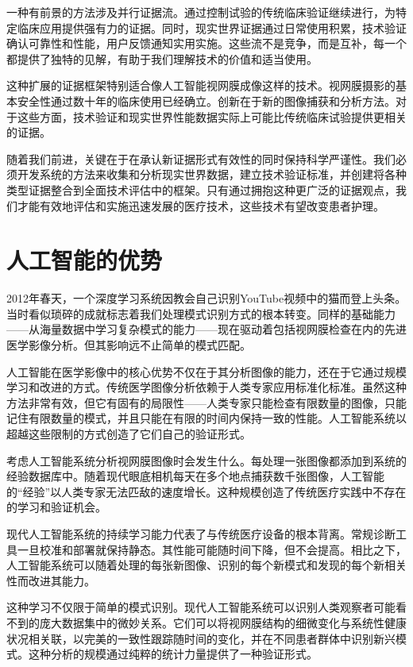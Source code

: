 \documentclass[
  Letterpaper,
]{scrbook}
\begin{document}
一种有前景的方法涉及并行证据流。通过控制试验的传统临床验证继续进行，为特定临床应用提供强有力的证据。同时，现实世界证据通过日常使用积累，技术验证确认可靠性和性能，用户反馈通知实用实施。这些流不是竞争，而是互补，每一个都提供了独特的见解，有助于我们理解技术的价值和适当使用。

这种扩展的证据框架特别适合像人工智能视网膜成像这样的技术。视网膜摄影的基本安全性通过数十年的临床使用已经确立。创新在于新的图像捕获和分析方法。对于这些方面，技术验证和现实世界性能数据实际上可能比传统临床试验提供更相关的证据。

随着我们前进，关键在于在承认新证据形式有效性的同时保持科学严谨性。我们必须开发系统的方法来收集和分析现实世界数据，建立技术验证标准，并创建将各种类型证据整合到全面技术评估中的框架。只有通过拥抱这种更广泛的证据观点，我们才能有效地评估和实施迅速发展的医疗技术，这些技术有望改变患者护理。

\section{人工智能的优势}\label{ux4ebaux5de5ux667aux80fdux7684ux4f18ux52bf}

2012年春天，一个深度学习系统因教会自己识别YouTube视频中的猫而登上头条。当时看似琐碎的成就标志着我们处理模式识别方式的根本转变。同样的基础能力------从海量数据中学习复杂模式的能力------现在驱动着包括视网膜检查在内的先进医学影像分析。但其影响远不止简单的模式匹配。

人工智能在医学影像中的核心优势不仅在于其分析图像的能力，还在于它通过规模学习和改进的方式。传统医学图像分析依赖于人类专家应用标准化标准。虽然这种方法非常有效，但它有固有的局限性------人类专家只能检查有限数量的图像，只能记住有限数量的模式，并且只能在有限的时间内保持一致的性能。人工智能系统以超越这些限制的方式创造了它们自己的验证形式。

考虑人工智能系统分析视网膜图像时会发生什么。每处理一张图像都添加到系统的经验数据库中。随着现代眼底相机每天在多个地点捕获数千张图像，人工智能的``经验''以人类专家无法匹敌的速度增长。这种规模创造了传统医疗实践中不存在的学习和验证机会。

现代人工智能系统的持续学习能力代表了与传统医疗设备的根本背离。常规诊断工具一旦校准和部署就保持静态。其性能可能随时间下降，但不会提高。相比之下，人工智能系统可以随着处理的每张新图像、识别的每个新模式和发现的每个新相关性而改进其能力。

这种学习不仅限于简单的模式识别。现代人工智能系统可以识别人类观察者可能看不到的庞大数据集中的微妙关系。它们可以将视网膜结构的细微变化与系统性健康状况相关联，以完美的一致性跟踪随时间的变化，并在不同患者群体中识别新兴模式。这种分析的规模通过纯粹的统计力量提供了一种验证形式。
\end{document}
